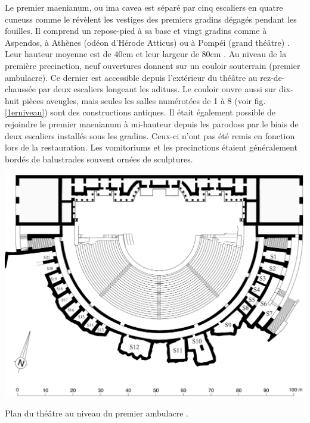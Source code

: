 		Le premier \gls{maenianum}, ou \gls{ima cavea} est séparé par cinq escaliers en quatre \glspl{cuneus} comme le révèlent les vestiges des premiers gradins dégagés pendant les fouilles. Il comprend un repose-pied à sa base et vingt gradins comme à Aspendos, à Athènes (odéon d'Hérode Atticus) ou à Pompéi (grand théâtre) \citep[p. 34]{formige}. Leur hauteur moyenne est de 40cm et leur largeur de 80cm \cite[p. 31]{formige}. Au niveau de la première \gls{precinction}, neuf ouvertures donnent  sur un couloir souterrain (premier \gls{ambulacre}). Ce dernier est accessible depuis l'extérieur du théâtre au rez-de-chaussée par deux escaliers longeant les \glspl{aditus}. Le couloir ouvre aussi sur dix-huit pièces aveugles, mais seules les salles numérotées de 1 à 8 (voir fig. \ref{1erniveau}) sont des constructions antiques. Il était également possible de rejoindre le premier \gls{maenianum} à mi-hauteur depuis les \glspl{parodos} par le biais de deux escaliers installés sous les gradins. Ceux-ci n'ont pas été remis en fonction lors de la restauration. Les \glspl{vomitorium} et les \glspl{precinction} étaient généralement bordés de balustrades souvent ornées de sculptures.
		
	\begin{figureth}
		\includegraphics[width=\linewidth]{images/1erniveau}
		\caption[Vue de dessus - 1er niveau]{Plan du théâtre au niveau du premier \gls{ambulacre} \footnotemark. }
		\label{1erniveau}
	\end{figureth}		
	

